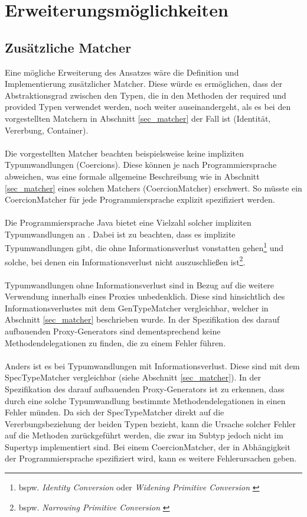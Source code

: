 \section{Erweiterungsmöglichkeiten}
\subsection{Zusätzliche Matcher}
Eine mögliche Erweiterung des Ansatzes wäre die Definition und Implementierung zusätzlicher Matcher. Diese würde es ermöglichen, dass der Abstraktionsgrad zwischen den Typen, die in den Methoden der required und provided Typen verwendet werden, noch weiter auseinandergeht, als es bei den vorgestellten Matchern in Abschnitt \ref{sec_matcher} der Fall ist (Identität, Vererbung, Container).
\\\\
Die vorgestellten Matcher beachten beispielsweise keine impliziten Typumwandlungen (Coercions). Diese können je nach Programmiersprache abweichen, was eine formale allgemeine Beschreibung wie in Abschnitt \ref{sec_matcher} eines solchen Matchers (CoercionMatcher) erschwert. So müsste ein CoercionMatcher für jede Programmiersprache explizit spezifiziert werden.
\\\\
Die Programmiersprache Java bietet eine Vielzahl solcher impliziten Typumwandlungen an \cite{conversions_and_promotions}. Dabei ist zu beachten, dass es implizite Typumwandlungen gibt, die ohne Informationsverlust vonstatten gehen\footnote{bspw. \emph{Identity Conversion} oder \emph{Widening Primitive Conversion} \cite{conversions_and_promotions}} und solche, bei denen ein Informationsverlust nicht auszuschließen ist\footnote{bspw. \emph{Narrowing Primitive Conversion} \cite{conversions_and_promotions}}. 
\\\\
Typumwandlungen ohne Informationsverlust sind in Bezug auf die weitere Verwendung innerhalb eines Proxies unbedenklich. Diese sind hinsichtlich des Informationsverlustes mit dem GenTypeMatcher vergleichbar, welcher in Abschnitt \ref{sec_matcher} beschrieben wurde. In der Spezifikation des darauf aufbauenden Proxy-Generators sind dementsprechend keine Methodendelegationen zu finden, die zu einem Fehler führen.
\\\\
Anders ist es bei Typumwandlungen mit Informationsverlust. Diese sind mit dem SpecTypeMatcher vergleichbar (siehe Abschnitt \ref{sec_matcher}). In der Spezifikation des darauf aufbauenden Proxy-Generators ist zu erkennen, dass durch eine solche Typumwandlung bestimmte Methodendelegationen in einen Fehler münden. Da sich der SpecTypeMatcher direkt auf die Vererbungsbeziehung der beiden Typen bezieht, kann die Ursache solcher Fehler auf die Methoden zurückgeführt werden, die zwar im Subtyp jedoch nicht im Supertyp implementiert sind. Bei einem CoercionMatcher, der in Abhängigkeit der Programmiersprache spezifiziert wird, kann es weitere Fehlerursachen geben.
